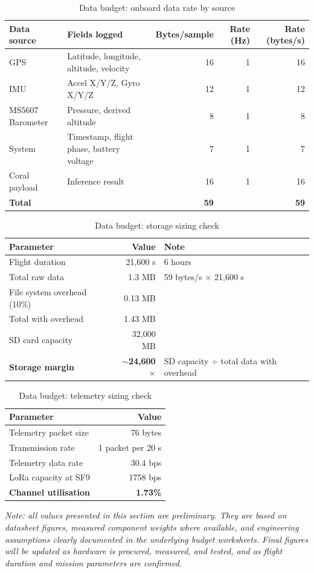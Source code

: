 \begin{table}[H]
\centering
\begin{tabular}{lp{4.5cm}rrr}
\toprule
\textbf{Data source} & \textbf{Fields logged} & \textbf{Bytes/sample} & \textbf{Rate (Hz)} & \textbf{Rate (bytes/s)} \\
\midrule
GPS & Latitude, longitude, altitude, velocity & 16 & 1 & 16 \\
IMU & Accel X/Y/Z, Gyro X/Y/Z & 12 & 1 & 12 \\
MS5607 Barometer & Pressure, derived altitude & 8 & 1 & 8 \\
System & Timestamp, flight phase, battery voltage & 7 & 1 & 7 \\
Coral payload & Inference result & 16 & 1 & 16 \\
\midrule
\textbf{Total} & & \textbf{59} & & \textbf{59} \\
\bottomrule
\end{tabular}
\caption{Data budget: onboard data rate by source}
\end{table}

\begin{table}[H]
\centering
\begin{tabular}{lrp{5cm}}
\toprule
\textbf{Parameter} & \textbf{Value} & \textbf{Note} \\
\midrule
Flight duration & 21{,}600 s & 6 hours \\
Total raw data & 1.3 MB & 59 bytes/s $\times$ 21{,}600 s \\
File system overhead (10\%) & 0.13 MB & \\
Total with overhead & 1.43 MB & \\
SD card capacity & 32{,}000 MB & \\
\midrule
\textbf{Storage margin} & \textbf{$\sim$24{,}600$\times$} & SD capacity $\div$ total data with overhead \\
\bottomrule
\end{tabular}
\caption{Data budget: storage sizing check}
\end{table}

\begin{table}[H]
\centering
\begin{tabular}{lr}
\toprule
\textbf{Parameter} & \textbf{Value} \\
\midrule
Telemetry packet size & 76 bytes \\
Transmission rate & 1 packet per 20 s \\
Telemetry data rate & 30.4 bps \\
LoRa capacity at SF9 & 1758 bps \\
\midrule
\textbf{Channel utilisation} & \textbf{1.73\%} \\
\bottomrule
\end{tabular}
\caption{Data budget: telemetry sizing check}
\end{table}

\textit{Note: all values presented in this section are preliminary. They are based on datasheet figures, measured component weights where available, and engineering assumptions clearly documented in the underlying budget worksheets. Final figures will be updated as hardware is procured, measured, and tested, and as flight duration and mission parameters are confirmed.}